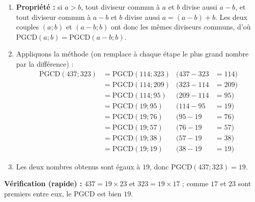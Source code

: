 \documentclass[11pt]{article}
\begin{document}
\begin{corrige}
\begin{enumerate}
    \item \textbf{Propriété :} si $a > b$, tout diviseur commun à $a$ et $b$ divise aussi $a - b$, et tout diviseur commun à $a - b$ et $b$ divise aussi $a = (a-b) + b$. Les deux couples $(a ; b)$ et $(a-b ; b)$ ont donc les mêmes diviseurs communs, d'où $\text{PGCD}(a ; b) = \text{PGCD}(a-b ; b)$.
    \item Appliquons la méthode (on remplace à chaque étape le plus grand nombre par la différence) :
    \begin{align*}
    \text{PGCD}(437 ; 323) &= \text{PGCD}(114 ; 323) & (437 - 323 &= 114)\\
    &= \text{PGCD}(114 ; 209) & (323 - 114 &= 209)\\
    &= \text{PGCD}(114 ; 95) & (209 - 114 &= 95)\\
    &= \text{PGCD}(19 ; 95) & (114 - 95 &= 19)\\
    &= \text{PGCD}(19 ; 76) & (95 - 19 &= 76)\\
    &= \text{PGCD}(19 ; 57) & (76 - 19 &= 57)\\
    &= \text{PGCD}(19 ; 38) & (57 - 19 &= 38)\\
    &= \text{PGCD}(19 ; 19) & (38 - 19 &= 19)
    \end{align*}
    \item Les deux nombres obtenus sont égaux à $19$, donc $\text{PGCD}(437 ; 323) = 19$.
\end{enumerate}
\textbf{Vérification (rapide) :} $437 = 19 \times 23$ et $323 = 19 \times 17$ ; comme $17$ et $23$ sont premiers entre eux, le PGCD est bien $19$.
\end{corrige}
\end{document}

